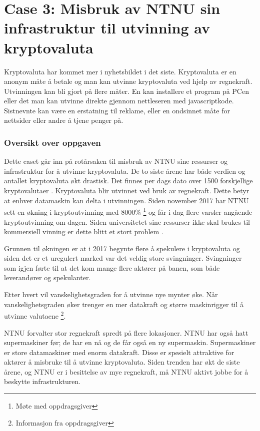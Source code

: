 \section{Case 3: Misbruk av NTNU sin infrastruktur til utvinning av kryptovaluta}
\label{sec:case_krypto}
Kryptovaluta har kommet mer i nyhetsbildet i det siste. Kryptovaluta er en anonym måte å betale og man kan utvinne kryptovaluta ved hjelp av regnekraft. Utvinningen kan bli gjort på flere måter. En kan installere et program på PCen eller det man kan utvinne direkte gjennom nettleseren med javascriptkode. Sistnevnte kan være en erstatning til reklame, eller en ondsinnet måte for nettsider eller andre å tjene penger på.



\subsubsection{Oversikt over oppgaven}
Dette caset går inn på rotårsaken til misbruk av NTNU sine ressurser og infrastruktur for å utvinne kryptovaluta. De to siste årene har både verdien og antallet kryptovaluta økt drastisk. Det finnes per dags dato over 1500 forskjellige kryptovalutaer \cite{Cryptocurrency}. 
Kryptovaluta blir utvinnet ved bruk av regnekraft. Dette betyr at enhver datamaskin kan delta i utvinningen. Siden november 2017 har NTNU sett en økning i kryptoutvinning med 8000\% \footnote{Møte med oppdragsgiver} og får i dag flere varsler angående kryptoutvinning om dagen. Siden universitetet sine ressurser ikke skal brukes til kommersiell vinning er dette blitt et stort problem \cite{ITReg}. 

Grunnen til økningen er at i 2017 begynte flere å spekulere i kryptovaluta og siden det er et uregulert marked var det veldig store svingninger. Svingninger som igjen førte til at det kom mange flere aktører på banen, som både leverandører og spekulanter. 

Etter hvert vil vanskelighetsgraden for å utvinne nye mynter øke. Når vanskelighetsgraden øker trenger en mer datakraft og større maskinrigger til å utvinne valutaene \footnote{Informasjon fra oppdragsgiver}. 

NTNU forvalter stor regnekraft spredt på flere lokasjoner. NTNU har også hatt supermaskiner før; de har en nå og de får også en ny supermaskin. Supermaskiner er store datamaskiner med enorm datakraft. Disse er spesielt attraktive for aktører å misbruke til å utvinne kryptovaluta. Siden trenden har økt de siste årene, og NTNU er i besittelse av mye regnekraft, må NTNU aktivt jobbe for å beskytte infrastrukturen. 

